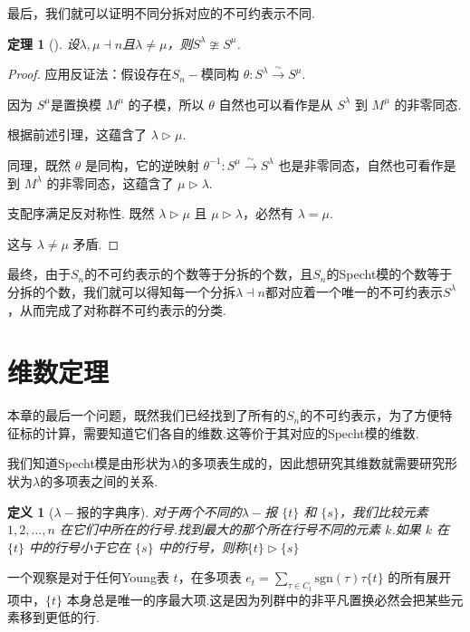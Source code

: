 \documentclass{sjtureport}
\newtheorem{theorem}{定理}[chapter]
\newtheorem{definition}{定义}[chapter]
\begin{document}
最后，我们就可以证明不同分拆对应的不可约表示不同.

\begin{theorem}[]
    设$\lambda,\mu\dashv n$且$\lambda\neq \mu$，则$S^\lambda\ncong S^\mu$.
\end{theorem}
\begin{proof}
    应用反证法：假设存在$S_n-\!$模同构 $\theta: S^\lambda \xrightarrow{\sim} S^\mu$.
    
    因为 $S^\mu$是置换模 $M^\mu$ 的子模，所以 $\theta$ 自然也可以看作是从 $S^\lambda$ 到 $M^\mu$ 的非零同态.
    
    根据前述引理，这蕴含了 $\lambda \rhd \mu$.
    
    同理，既然 $\theta$ 是同构，它的逆映射 $\theta^{-1}: S^\mu \xrightarrow{\sim} S^\lambda$ 也是非零同态，自然也可看作是到 $M^\lambda$ 的非零同态，这蕴含了 $\mu \rhd \lambda$.
    
    支配序满足反对称性. 既然 $\lambda \rhd \mu$ 且 $\mu \rhd \lambda$，必然有 $\lambda = \mu$.
    
    这与 $\lambda \neq \mu$ 矛盾.
\end{proof}

最终，由于$S_n$的不可约表示的个数等于分拆的个数，且$S_n$的Specht模的个数等于分拆的个数，我们就可以得知每一个分拆$\lambda\dashv n$都对应着一个唯一的不可约表示$S^\lambda$，从而完成了对称群不可约表示的分类.

\section{维数定理}

本章的最后一个问题，既然我们已经找到了所有的$S_n$的不可约表示，为了方便特征标的计算，需要知道它们各自的维数.这等价于其对应的Specht模的维数.\par
我们知道Specht模是由形状为$\lambda$的多项表生成的，因此想研究其维数就需要研究形状为$\lambda$的多项表之间的关系.

\begin{definition}[$\lambda-\!$报的字典序]
    对于两个不同的$\lambda-\!$报 $\{t\}$ 和 $\{s\}$，我们比较元素 $1, 2, \dots, n$ 在它们中所在的行号.找到最大的那个所在行号不同的元素 $k$.如果 $k$ 在 $\{t\}$ 中的行号小于它在 $\{s\}$ 中的行号，则称$\{t\} \rhd \{s\}$
\end{definition}
一个观察是对于任何Young表 $t$，在多项表 $e_t = \sum_{\tau \in C_t} \mathrm{sgn}(\tau)\tau \{t\}$ 的所有展开项中，$\{t\}$ 本身总是唯一的序最大项.这是因为列群中的非平凡置换必然会把某些元素移到更低的行.
\end{document}
